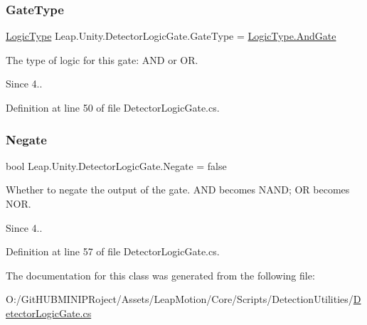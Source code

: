 \subsubsection{\texorpdfstring{GateType}{GateType}}
{\footnotesize\ttfamily \mbox{\hyperlink{namespace_leap_1_1_unity_a77852b6f4a12b4cff02c45dd93e7b2b1}{Logic\+Type}} Leap.\+Unity.\+Detector\+Logic\+Gate.\+Gate\+Type = \mbox{\hyperlink{namespace_leap_1_1_unity_a77852b6f4a12b4cff02c45dd93e7b2b1a296b4d7851ca3e55bce82683249c4d0e}{Logic\+Type.\+And\+Gate}}}

The type of logic for this gate\+: A\+ND or OR. \begin{DoxySince}{Since}
4.. 
\end{DoxySince}


Definition at line 50 of file Detector\+Logic\+Gate.\+cs.

\mbox{\label{class_leap_1_1_unity_1_1_detector_logic_gate_a0c78e1045905a4dd1c349aa677a8a97d}} 
\subsubsection{\texorpdfstring{Negate}{Negate}}
{\footnotesize\ttfamily bool Leap.\+Unity.\+Detector\+Logic\+Gate.\+Negate = false}

Whether to negate the output of the gate. A\+ND becomes N\+A\+ND; OR becomes N\+OR. \begin{DoxySince}{Since}
4.. 
\end{DoxySince}


Definition at line 57 of file Detector\+Logic\+Gate.\+cs.



The documentation for this class was generated from the following file\+:\begin{DoxyCompactItemize}
\item 
O\+:/\+Git\+H\+U\+B\+M\+I\+N\+I\+P\+Roject/\+Assets/\+Leap\+Motion/\+Core/\+Scripts/\+Detection\+Utilities/\mbox{\hyperlink{_detector_logic_gate_8cs}{Detector\+Logic\+Gate.\+cs}}\end{DoxyCompactItemize}

